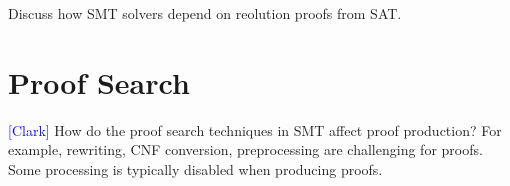\documentclass{llncs}
\newcommand{\Note}[1]{\textcolor{blue}{[#1]}}
\begin{document}




Discuss how SMT solvers depend on reolution proofs from SAT.






\section{Proof Search}

\Note{Clark}
How do the proof search techniques in SMT affect proof production?  For
example, rewriting, CNF conversion, preprocessing are challenging for proofs.
Some processing is typically disabled when producing proofs.


\end{document}
